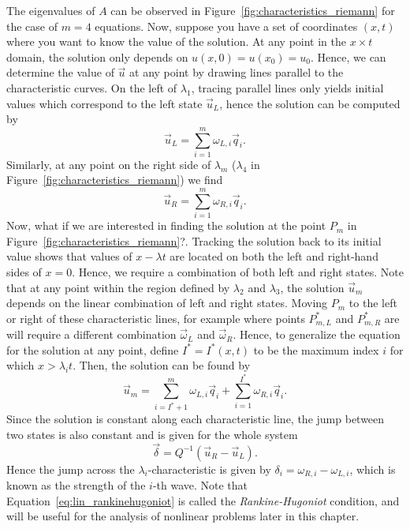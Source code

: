 The eigenvalues of $A$ can be observed in Figure~\ref{fig:characteristics_riemann} for the case of $m=4$ equations. Now, suppose you have a set of coordinates $(x,t)$ where you want to know the value of the solution. At any point in the $x\times t$ domain, the solution only depends on $u(x,0)=u(x_0)=u_0$. Hence, we can determine the value of $\vec u$ at any point by drawing lines parallel to the characteristic curves. On the left of $\lambda_1$, tracing parallel lines only yields initial values which correspond to the left state $\vec u_L$, hence the solution can be computed by
\begin{equation}
	\vec u_L = \sum_{i=1}^m  \omega_{L,i} \vec q_i.
\end{equation}
Similarly, at any point on the right side of $\lambda_m$ ($\lambda_4$ in Figure~\ref{fig:characteristics_riemann}) we find
\begin{equation}
	\vec u_R = \sum_{i=1}^m  \omega_{R,i} \vec q_i.
\end{equation}
Now, what if we are interested in finding the solution at the point $P_m$ in Figure~\ref{fig:characteristics_riemann}?. Tracking the solution back to its initial value shows that values of $x-\lambda t$ are located on both the left and right-hand sides of $x=0$. Hence, we require a combination of both left and right states. Note that at any point within the region defined by $\lambda_2$ and $\lambda_3$, the solution $\vec u_m$ depends on the linear combination of left and right states. Moving $P_m$ to the left or right of these characteristic lines, for example where points $P_{m,L}^*$ and $P_{m,R}^*$ are will require a different combination $\vec \omega_L$ and $\vec\omega_R$. Hence, to generalize the equation for the solution at any point, define $I^*=I^*(x,t)$ to be the maximum index $i$ for which $x>\lambda_i t$.  Then, the solution can be found by
\begin{equation}
	\vec u_m = \sum_{i=I^*+1}^m \omega_{L,i} \vec q_i + \sum_{i=1}^{I^*} \omega_{R,i} \vec q_i.
	\label{eq:riemann_solution}
\end{equation}
Since the solution is constant along each characteristic line, the jump between two states is also constant and is given for the whole system
\begin{equation}
	\vec \delta = Q^{-1}(\vec u_R - \vec u_L). 
	\label{eq:lin_rankinehugoniot}
\end{equation}
Hence the jump across the $\lambda_i$-characteristic is given by $\delta_i = \omega_{R,i}-\omega_{L,i}$, which is known as the strength of the $i$-th wave. Note that Equation~\ref{eq:lin_rankinehugoniot} is called the \textit{Rankine-Hugoniot} condition, and will be useful for the analysis of nonlinear problems later in this chapter.

